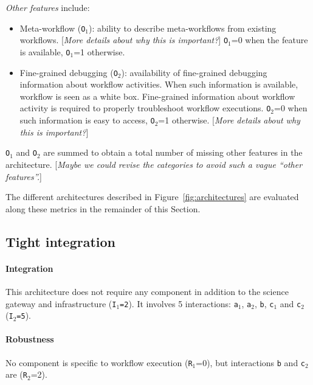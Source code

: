 \documentclass[preprint,3p,twocolumn]{elsarticle}
\newcommand{\todo}[1]{\color{blue}\xspace[\emph{#1}]\xspace\color{black}}
\begin{document}
\emph{Other features} include:
\begin{itemize}[leftmargin=0cm,itemindent=0.35cm,itemsep=0cm]
\item Meta-workflow (\texttt{O$_1$}): ability to describe
  meta-workflows from existing workflows.  \todo{More details about
    why this is important?} \texttt{O$_1$}=0 when the feature is
  available, \texttt{O$_1$}=1 otherwise.
\item Fine-grained debugging (\texttt{O$_2$}): availability of
  fine-grained debugging information about workflow activities. When
  such information is available, workflow is seen as a white
  box. Fine-grained information about workflow activity is required to
  properly troubleshoot workflow executions.  \texttt{O$_2$}=0 when
  such information is easy to access, \texttt{O$_2$}=1
  otherwise. \todo{More details about why this is important?}
\end{itemize}
\texttt{O$_1$} and \texttt{O$_2$} are summed to obtain a total number of missing other
features in the architecture.  \todo{Maybe we could revise the
  categories to avoid such a vague ``other features''.}


The different architectures described in
Figure~\ref{fig:architectures} are evaluated along these metrics in
the remainder of this Section.

\subsection{Tight integration}

\paragraph{Integration} This architecture does not require any
component in addition to the science gateway and infrastructure
(\texttt{I$_1$=2}). It involves 5 interactions: \texttt{a$_1$},
\texttt{a$_2$}, \texttt{b}, \texttt{c$_1$} and \texttt{c$_2$}
(\texttt{I$_2$=5}).

\paragraph{Robustness} No component is specific to workflow execution
(\texttt{R$_1$}=0), but interactions \texttt{b} and \texttt{c$_2$} are
(\texttt{R$_2$}=2).
\end{document}
